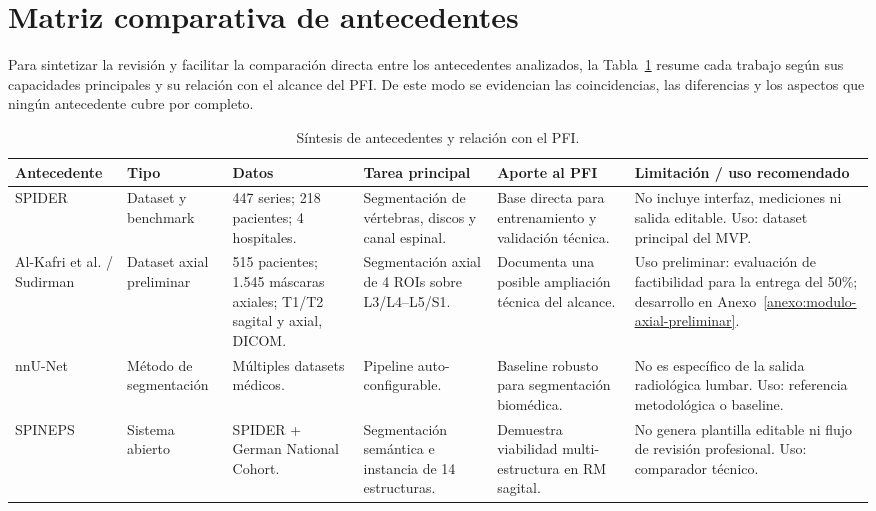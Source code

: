 \Needspace{0.92\textheight}
\section{Matriz comparativa de antecedentes}

Para sintetizar la revisión y facilitar la comparación directa entre los antecedentes analizados, la Tabla~\ref{tab:sintesis_antecedentes_pfi} resume cada trabajo según sus capacidades principales y su relación con el alcance del PFI. De este modo se evidencian las coincidencias, las diferencias y los aspectos que ningún antecedente cubre por completo.

\begin{table}[H]
\centering
\scriptsize
\setlength{\tabcolsep}{3pt}
\renewcommand{\arraystretch}{1.12}
\caption{Síntesis de antecedentes y relación con el PFI.}
\label{tab:sintesis_antecedentes_pfi}
\begin{adjustbox}{width=\textwidth}
\begin{tabularx}{\textwidth}{p{} p{} p{} X X X}
\hline
\textbf{Antecedente} & \textbf{Tipo} & \textbf{Datos} & \textbf{Tarea principal} & \textbf{Aporte al PFI} & \textbf{Limitación / uso recomendado} \\
\hline
SPIDER \parencite{vandergraaf_spider_2024} & Dataset y benchmark & 447 series; 218 pacientes; 4 hospitales. & Segmentación de vértebras, discos y canal espinal. & Base directa para entrenamiento y validación técnica. & No incluye interfaz, mediciones ni salida editable. Uso: dataset principal del MVP. \\
Al-Kafri et al. / Sudirman \parencite{alkafri_sudirman_boundary_2019} & Dataset axial preliminar & 515 pacientes; 1.545 máscaras axiales; T1/T2 sagital y axial, DICOM. & Segmentación axial de 4 ROIs sobre L3/L4--L5/S1. & Documenta una posible ampliación técnica del alcance. & Uso preliminar: evaluación de factibilidad para la entrega del 50\%; desarrollo en Anexo~\ref{anexo:modulo-axial-preliminar}. \\
nnU-Net \parencite{isensee_nnunet_2021} & Método de segmentación & Múltiples datasets médicos. & Pipeline auto-configurable. & Baseline robusto para segmentación biomédica. & No es específico de la salida radiológica lumbar. Uso: referencia metodológica o baseline. \\
SPINEPS \parencite{moller_spineps_2025} & Sistema abierto & SPIDER + German National Cohort. & Segmentación semántica e instancia de 14 estructuras. & Demuestra viabilidad multi-estructura en RM sagital. & No genera plantilla editable ni flujo de revisión profesional. Uso: comparador técnico. \\

\end{tabularx}
\end{adjustbox}
\end{table}
